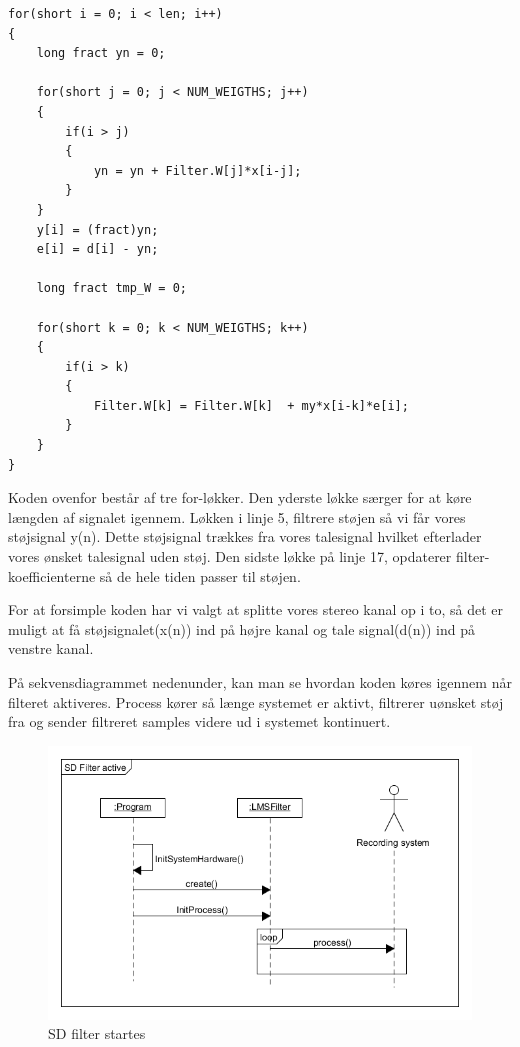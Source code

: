 \newpage


\begin{lstlisting}
for(short i = 0; i < len; i++)
{
	long fract yn = 0;

	for(short j = 0; j < NUM_WEIGTHS; j++)
	{
		if(i > j)
		{
			yn = yn + Filter.W[j]*x[i-j];
		}
	}
	y[i] = (fract)yn;
	e[i] = d[i] - yn;
		
	long fract tmp_W = 0;
		
	for(short k = 0; k < NUM_WEIGTHS; k++)
	{
		if(i > k)
		{
			Filter.W[k] = Filter.W[k]  + my*x[i-k]*e[i];
		}
	}
}
\end{lstlisting}

Koden ovenfor består af tre for-løkker. Den yderste løkke særger for at køre længden af signalet igennem. Løkken i linje 5, filtrere støjen så vi får vores støjsignal y(n). Dette støjsignal trækkes fra vores talesignal hvilket efterlader vores ønsket talesignal uden støj. Den sidste løkke på linje 17, opdaterer filter-koefficienterne så de hele tiden passer til støjen.

For at forsimple koden har vi valgt at splitte vores stereo kanal op i to, så det er muligt at få støjsignalet(x(n)) ind på højre kanal og tale signal(d(n)) ind på venstre kanal.

På sekvensdiagrammet nedenunder, kan man se hvordan koden køres igennem når filteret aktiveres. Process kører så længe systemet er aktivt, filtrerer uønsket støj fra og sender filtreret samples videre ud i systemet kontinuert.

\begin{figure}[H]
	\centering
	\includegraphics[width = 400pt]{Img/SD_filter_active.png}
	\caption{SD filter startes}
	\label{fig:SD}
\end{figure}